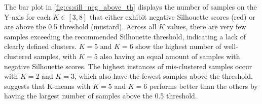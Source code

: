 The bar plot in \cref{fig:cs:sill_neg_above_th} displays the number of samples on the Y-axis for each $K \in [3, 8]$ that either exhibit negative Silhouette scores (red) or are above the 0.5 threshold (mustard). Across all $K$ values, there are very few samples exceeding the recommended Silhouette threshold, indicating a lack of clearly defined clusters. $K=5$ and $K=6$ show the highest number of well-clustered samples, with $K=5$ also having an equal amount of samples with negative Silhouette scores. The highest instances of mis-clustered samples occur with $K=2$ and $K=3$, which also have the fewest samples above the threshold.  suggests that K-means with $K=5$ and $K=6$ performs better than the others by having the largest number of samples above the 0.5 threshold.



